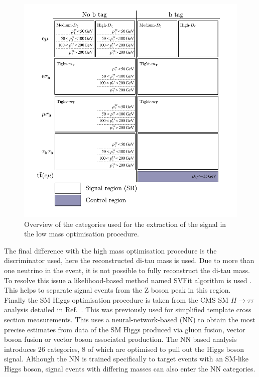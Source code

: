 \begin{figure}[!hbtp]
\centering
    \includegraphics[width=1.0\textwidth]{Figures/low_mass_categories.pdf}
\caption{Overview of the categories used for the extraction of the signal in the low mass optimisation procedure.}
\label{fig:low_mass_categories}
\end{figure}

The final difference with the high mass optimisation procedure is the discriminator used, here the reconstructed di-tau mass is used.
Due to more than one neutrino in the event, it is not possible to fully reconstruct the di-tau mass.
To resolve this issue a likelihood-based method named SVFit algorithm is used \cite{Bianchini:2014vza}.
This helps to separate signal events from the Z boson peak in this region. \\

Finally the SM Higgs optimisation procedure is taken from the CMS SM $H \rightarrow \tau\tau$ analysis detailed in Ref.~\cite{CMS:2022kdi}.
This was previously used for simplified template cross section measurements.
This uses a neural-network-based (NN) to obtain the most precise estimates from data of the SM Higgs produced via gluon fusion, vector boson fusion or vector boson associated production.
The NN based analysis introduces 26 categories, 8 of which are optimised to pull out the Higgs boson signal.
Although the NN is trained specifically to target events with an SM-like Higgs boson, signal events with differing masses can also enter the NN categories.

